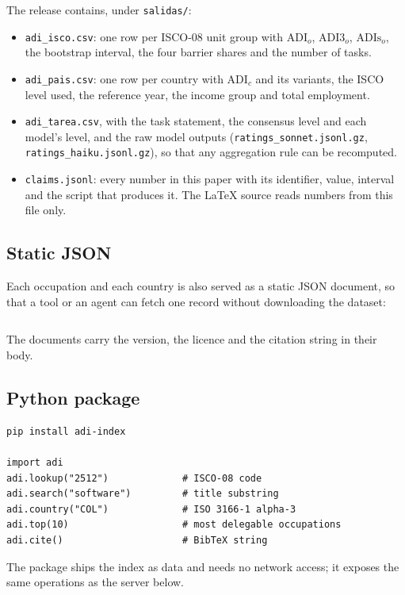 \documentclass[preprint,12pt,authoryear]{elsarticle}
\begin{document}
The release contains, under \texttt{salidas/}:
\begin{itemize}
  \item \texttt{adi\_isco.csv}: one row per ISCO-08 unit group with $\mathrm{ADI}_o$, $\mathrm{ADI3}_o$, $\mathrm{ADIs}_o$, the bootstrap interval, the four barrier shares and the number of tasks.
  \item \texttt{adi\_pais.csv}: one row per country with $\mathrm{ADI}_c$ and its variants, the ISCO level used, the reference year, the income group and total employment.
  \item \texttt{adi\_tarea.csv}, with the task statement, the consensus level and each model's level, and the raw model outputs (\texttt{ratings\_sonnet.jsonl.gz}, \texttt{ratings\_haiku.jsonl.gz}), so that any aggregation rule can be recomputed.
  \item \texttt{claims.jsonl}: every number in this paper with its identifier, value, interval and the script that produces it. The LaTeX source reads numbers from this file only.
\end{itemize}

\subsection{Static JSON}

Each occupation and each country is also served as a static JSON document, so that a tool or an agent can fetch one record without downloading the dataset:
\begin{verbatim}
\end{verbatim}
The documents carry the version, the licence and the citation string in their body.

\subsection{Python package}

\begin{verbatim}
pip install adi-index

import adi
adi.lookup("2512")             # ISCO-08 code
adi.search("software")         # title substring
adi.country("COL")             # ISO 3166-1 alpha-3
adi.top(10)                    # most delegable occupations
adi.cite()                     # BibTeX string
\end{verbatim}
The package ships the index as data and needs no network access; it exposes the same operations as the server below.
\end{document}
